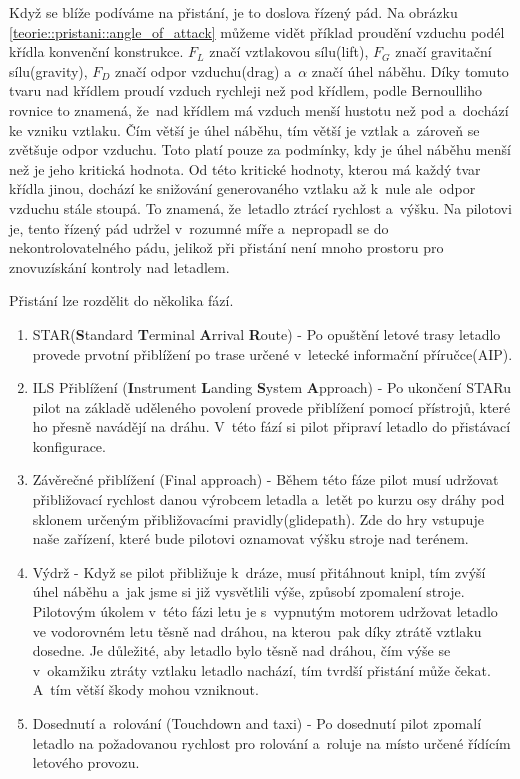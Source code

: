 		Když se blíže podíváme na přistání, je to doslova řízený pád. Na obrázku \ref{teorie::pristani::angle_of_attack} můžeme vidět příklad proudění vzduchu podél křídla konvenční konstrukce. $F_L$ značí vztlakovou sílu(lift), $F_G$ značí gravitační sílu(gravity), $F_D$ značí odpor vzduchu(drag) a~$\alpha$ značí úhel náběhu. Díky tomuto tvaru nad křídlem proudí vzduch rychleji než pod křídlem, podle Bernoulliho rovnice to znamená, že~nad křídlem má vzduch menší hustotu než pod a~dochází ke vzniku vztlaku. Čím větší je úhel náběhu, tím větší je vztlak a~zároveň se zvětšuje odpor vzduchu. Toto platí pouze za podmínky, kdy je úhel náběhu menší než je jeho kritická hodnota. Od této kritické hodnoty, kterou má každý tvar křídla jinou, dochází ke snižování generovaného vztlaku až k~nule ale~odpor vzduchu stále stoupá. To znamená, že~letadlo ztrácí rychlost a~výšku. Na pilotovi je, tento řízený pád udržel v~rozumné míře a~nepropadl se do nekontrolovatelného pádu, jelikož při přistání není mnoho prostoru pro znovuzískání kontroly nad letadlem.\par
		Přistání lze rozdělit do několika fází\cite{landingPhases}.
		
		\begin{enumerate}
			\item STAR(\textbf{S}tandard \textbf{T}erminal \textbf{A}rrival \textbf{R}oute) - Po opuštění letové trasy letadlo provede prvotní přiblížení po trase určené v~letecké informační příručce(AIP). 
			
			\item ILS Přiblížení (\textbf{I}nstrument \textbf{L}anding \textbf{S}ystem \textbf{A}pproach) - Po ukončení STARu pilot na základě uděleného povolení provede přiblížení pomocí přístrojů, které ho přesně navádějí na dráhu. V~této fází si pilot připraví letadlo do přistávací konfigurace.
		
			\item Závěrečné přiblížení (Final approach) - Během této fáze pilot musí udržovat přibližovací rychlost danou výrobcem letadla a~letět po kurzu osy dráhy pod sklonem určeným přibližovacími pravidly(glidepath). Zde do hry vstupuje naše zařízení, které bude pilotovi oznamovat výšku stroje nad terénem.
					
			\item Výdrž - Když se pilot přibližuje k~dráze, musí přitáhnout knipl, tím zvýší úhel náběhu a~jak jsme si již vysvětlili výše, způsobí zpomalení stroje. Pilotovým úkolem v~této fázi letu je s~vypnutým motorem udržovat letadlo ve vodorovném letu těsně nad dráhou, na kterou~pak díky ztrátě vztlaku dosedne. Je důležité, aby letadlo bylo těsně nad dráhou, čím výše se v~okamžiku ztráty vztlaku letadlo nachází, tím tvrdší přistání může čekat. A~tím větší škody mohou vzniknout.
					
			\item Dosednutí a~rolování (Touchdown and taxi) - Po dosednutí pilot zpomalí letadlo na požadovanou rychlost pro rolování a~roluje na místo určené řídícím letového provozu. 
		\end{enumerate}
				
